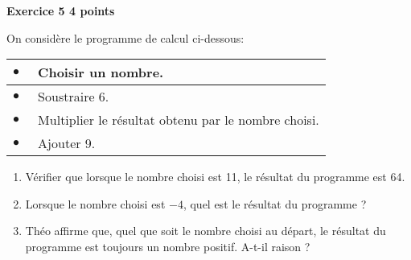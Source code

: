 \textbf{Exercice 5 \hfill 4 points}

\medskip 

On considère le programme de calcul ci-dessous: 

\medskip
\begin{center}
\begin{tabularx}{0.71\linewidth}{|lX|}\hline 
$\bullet~~$&Choisir un nombre.\\ \hline 
$\bullet~~$&Soustraire 6. \\ \hline 
$\bullet~~$&Multiplier le résultat obtenu par le nombre choisi.\\ \hline 
$\bullet~~$&Ajouter 9. \\ \hline 
\end{tabularx}
\end{center}

\begin{enumerate}
\item Vérifier que lorsque le nombre choisi est 11, le résultat du programme est 64. 
\item Lorsque le nombre choisi est $- 4$, quel est le résultat du programme ? 
\item Théo affirme que, quel que soit le nombre choisi au départ, le résultat du programme est toujours un nombre positif. A-t-il raison ? 
\end{enumerate}

\vspace{0.5cm}

